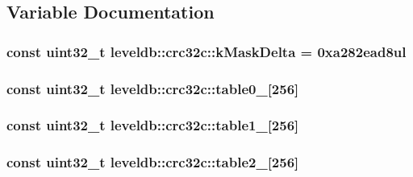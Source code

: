 \subsection{Variable Documentation}
\hypertarget{namespaceleveldb_1_1crc32c_ae1bd49dbeac3e469a5a4347989f2e8b3}{
\subsubsection[{k\-Mask\-Delta}]{\setlength{\rightskip}{0pt plus 5cm}const {\bf uint32\-\_\-t} leveldb\-::crc32c\-::k\-Mask\-Delta = 0xa282ead8ul\hspace{0.3cm}{\ttfamily [static]}}}\label{namespaceleveldb_1_1crc32c_ae1bd49dbeac3e469a5a4347989f2e8b3}
\hypertarget{namespaceleveldb_1_1crc32c_ade0c8f1e2098799a8924d05b30411817}{
\subsubsection[{table0\-\_\-}]{\setlength{\rightskip}{0pt plus 5cm}const {\bf uint32\-\_\-t} leveldb\-::crc32c\-::table0\-\_\-\mbox{[}256\mbox{]}\hspace{0.3cm}{\ttfamily [static]}}}\label{namespaceleveldb_1_1crc32c_ade0c8f1e2098799a8924d05b30411817}
\hypertarget{namespaceleveldb_1_1crc32c_af456bfb794e6108a828e5d3a2a58700c}{
\subsubsection[{table1\-\_\-}]{\setlength{\rightskip}{0pt plus 5cm}const {\bf uint32\-\_\-t} leveldb\-::crc32c\-::table1\-\_\-\mbox{[}256\mbox{]}\hspace{0.3cm}{\ttfamily [static]}}}\label{namespaceleveldb_1_1crc32c_af456bfb794e6108a828e5d3a2a58700c}
\hypertarget{namespaceleveldb_1_1crc32c_af5be8e058bd89cbd43972aa986910599}{
\subsubsection[{table2\-\_\-}]{\setlength{\rightskip}{0pt plus 5cm}const {\bf uint32\-\_\-t} leveldb\-::crc32c\-::table2\-\_\-\mbox{[}256\mbox{]}\hspace{0.3cm}{\ttfamily [static]}}}\label{namespaceleveldb_1_1crc32c_af5be8e058bd89cbd43972aa986910599}
